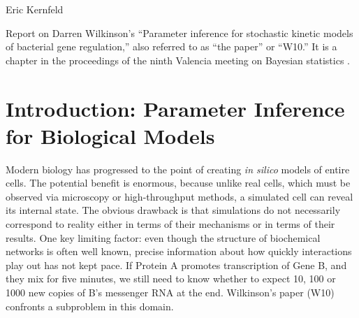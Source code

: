\documentclass{article}
\newcommand\EMK[1]{\textcolor{purple}{EMK: #1}}
\begin{document}
Eric Kernfeld

Report on Darren Wilkinson's ``Parameter inference for stochastic kinetic models of bacterial gene regulation,'' also referred to as ``the paper'' or ``W10.'' It is a chapter in the proceedings of the ninth Valencia meeting on Bayesian statistics \cite{Bernardo2012}. 

\begin{abstract}
In this paper, Wilkinson attempts to infer reaction rates for biochemical networks in a setting with discrete observations, missing data, and measurement error. He uses vague priors and likelihood-free MCMC methods within a Bayesian model. He runs four main simulations. The first three iterate through successively more difficult and realistic measurement models, and they show the approach can accurately infer three key reaction rates with a useful precision. The fourth studies a naive model, showing it leads to overconfident, incorrect inferences. 

I review some alternative methods in detail and discuss the relative merits of W10's approach. I implement the method in Julia and attempt to reproduce the experiments \EMK{more on this later!}. I assess the method using additional experiments designed to study mixing time, scaling with system size, and prior sensitivity \EMK{more on this later!}. 
\end{abstract}

\tableofcontents
\newpage


\section{Introduction: Parameter Inference for Biological Models}

Modern biology has progressed to the point of creating {\it in silico} models of entire cells. The potential benefit is enormous, because unlike real cells, which must be observed via microscopy or high-throughput methods, a simulated cell can reveal its internal state. The obvious drawback is that simulations do not necessarily correspond to reality either in terms of their mechanisms or in terms of their results. One key limiting factor: even though the structure of biochemical networks is often well known, precise information about how quickly interactions play out has not kept pace. If Protein A promotes transcription of Gene B, and they mix for five minutes, we still need to know whether to expect 10, 100 or 1000 new copies of B's messenger RNA at the end. Wilkinson's paper (W10) confronts a subproblem in this domain.
\end{document}
